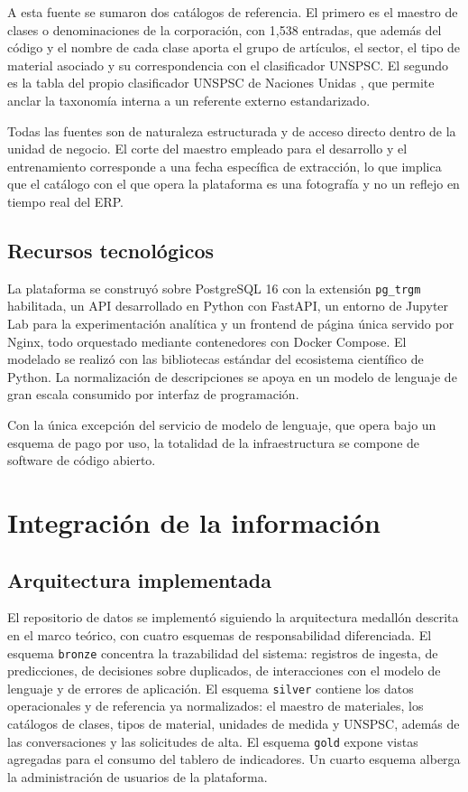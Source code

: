 A esta fuente se sumaron dos catálogos de referencia. El primero es el maestro de clases o denominaciones de la corporación, con 1,538 entradas, que además del código y el nombre de cada clase aporta el grupo de artículos, el sector, el tipo de material asociado y su correspondencia con el clasificador UNSPSC. El segundo es la tabla del propio clasificador UNSPSC de Naciones Unidas \cite{undp2023}, que permite anclar la taxonomía interna a un referente externo estandarizado.

Todas las fuentes son de naturaleza estructurada y de acceso directo dentro de la unidad de negocio. El corte del maestro empleado para el desarrollo y el entrenamiento corresponde a una fecha específica de extracción, lo que implica que el catálogo con el que opera la plataforma es una fotografía y no un reflejo en tiempo real del ERP.

\subsection{Recursos tecnológicos}
La plataforma se construyó sobre PostgreSQL 16 con la extensión \texttt{pg\_trgm} habilitada, un API desarrollado en Python con FastAPI, un entorno de Jupyter Lab para la experimentación analítica y un frontend de página única servido por Nginx, todo orquestado mediante contenedores con Docker Compose. El modelado se realizó con las bibliotecas estándar del ecosistema científico de Python. La normalización de descripciones se apoya en un modelo de lenguaje de gran escala consumido por interfaz de programación.

Con la única excepción del servicio de modelo de lenguaje, que opera bajo un esquema de pago por uso, la totalidad de la infraestructura se compone de software de código abierto.

\section{Integración de la información}

\subsection{Arquitectura implementada}
El repositorio de datos se implementó siguiendo la arquitectura medallón descrita en el marco teórico, con cuatro esquemas de responsabilidad diferenciada. El esquema \texttt{bronze} concentra la trazabilidad del sistema: registros de ingesta, de predicciones, de decisiones sobre duplicados, de interacciones con el modelo de lenguaje y de errores de aplicación. El esquema \texttt{silver} contiene los datos operacionales y de referencia ya normalizados: el maestro de materiales, los catálogos de clases, tipos de material, unidades de medida y UNSPSC, además de las conversaciones y las solicitudes de alta. El esquema \texttt{gold} expone vistas agregadas para el consumo del tablero de indicadores. Un cuarto esquema alberga la administración de usuarios de la plataforma.

